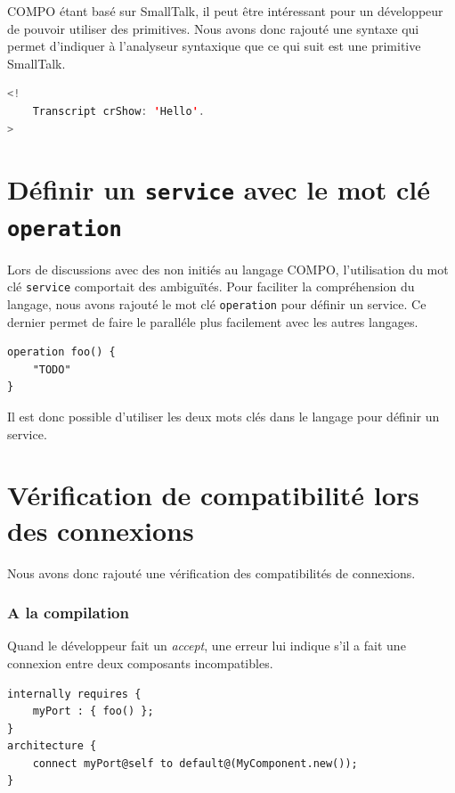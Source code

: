 \documentclass[11pt,a4paper,openany,oneside]{book}
\begin{document}
COMPO étant basé sur SmallTalk, il peut être intéressant pour un développeur de pouvoir utiliser des primitives.
Nous avons donc rajouté une syntaxe qui permet d'indiquer à l'analyseur syntaxique que ce qui suit est une primitive SmallTalk. 

\begin{lstlisting}[language=JAVA, frame=single, caption=Syntaxe d'une primitive smalltalk en COMPO]
<! 
    Transcript crShow: 'Hello'.
>
\end{lstlisting}

\section{Définir un \texttt{service} avec le mot clé \texttt{operation} }

Lors de discussions avec des non initiés au langage COMPO, l'utilisation du mot clé \texttt{service} comportait des ambiguïtés. Pour faciliter la compréhension du langage, nous avons rajouté le mot clé \texttt{operation} pour définir un service. Ce dernier permet de faire le paralléle plus facilement avec les autres langages.

\begin{lstlisting}[language=COMPO, frame=single, caption=Syntaxe d'une opération en COMPO]
operation foo() {
    "TODO"
}
\end{lstlisting}

Il est donc possible d'utiliser les deux mots clés dans le langage pour définir un service.


\section{Vérification de compatibilité lors des connexions}

Nous avons donc rajouté une vérification des compatibilités de connexions.

\subsubsection{A la compilation}

Quand le développeur fait un \textit{accept}, une erreur lui indique s'il a fait une connexion entre deux composants incompatibles.

\begin{lstlisting}[language=Compo, frame=single, caption=Exemple de connexion incorrecte]
internally requires {
    myPort : { foo() };
}
architecture {
    connect myPort@self to default@(MyComponent.new());
}
\end{lstlisting}
\end{document}
